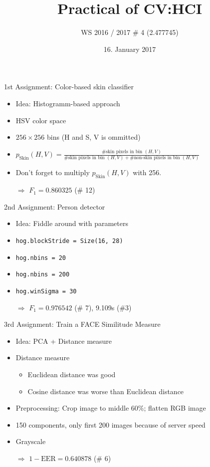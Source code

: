 \documentclass{beamer}
\title{Practical of CV:HCI}
\subtitle{WS 2016 / 2017 \# 4 (2.477745)}
\author[Martin\,Thoma \& Bettina\,Weller\& Yang\,Zhang]
{%
  \texorpdfstring{
    \begin{columns}%
      \column{.30\linewidth}
      \centering
      Martin Thoma\      \href{mailto:info@martin-thoma.de}{info@martin-thoma.de}
      \column{.30\linewidth}
      \centering
      Bettina Weller\    %
      \column{.30\linewidth}
      \centering
      Yang Zhang\    %
    \end{columns}
  }
  {John Doe \& Jane Doe}
}
\date{16. January 2017}
\begin{document}
\frame{\titlepage}

\begin{frame}{1st Assignment: Color-based skin classifier}
    \begin{itemize}
        \item Idea: Histogramm-based approach
        \item HSV color space
        \item $256 \times 256$ bins (H and S, V is ommitted)
        \item $p_\text{Skin}(H, V) = \frac{\text{\# skin pixels in bin } (H, V)}{\text{\# skin pixels in bin } (H, V) + \text{\# non-skin pixels in bin } (H, V)}$
        \item Don't forget to multiply $p_\text{Skin}(H, V)$ with 256.
        \item[$\Rightarrow$] $F_1 = 0.860325$ (\# 12)
    \end{itemize}
\end{frame}

\begin{frame}{2nd Assignment: Person detector}
    \begin{itemize}
        \item Idea: Fiddle around with parameters
        \item \texttt{hog.blockStride = Size(16, 28)}
        \item \texttt{hog.nbins = 20}
        \item \texttt{hog.nbins = 200}
        \item \texttt{hog.winSigma = 30}
        \item[$\Rightarrow$] $F_1 = 0.976542$ (\# 7), 9.109s (\#3)
    \end{itemize}
\end{frame}

\begin{frame}{3rd Assignment: Train a FACE Similitude Measure}
    \begin{itemize}
        \item Idea: PCA + Distance measure
        \item Distance measure
        \begin{itemize}
            \item Euclidean distance was good
            \item Cosine distance was worse than Euclidean distance
        \end{itemize}
        \item Preprocessing: Crop image to middle 60\%; flatten RGB image
        \item 150 components, only first 200 images because of server speed
        \item Grayscale
        \item[$\Rightarrow$] $1- \text{EER} = 0.640878$ (\# 6)
    \end{itemize}
\end{frame}
\end{document}
